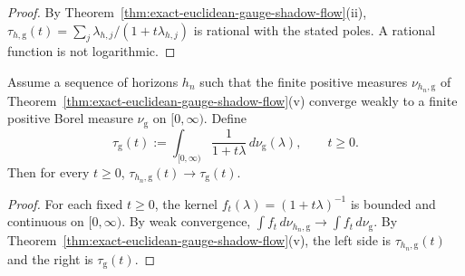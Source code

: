 \begin{proof}
By Theorem~\ref{thm:exact-euclidean-gauge-shadow-flow}(ii),
$\tau_{h,\mathrm g}(t)=\sum_j\lambda_{h,j}/(1+t\lambda_{h,j})$
is rational with the stated poles. A rational function is not logarithmic.
\end{proof}

\begin{theorem}
\label{thm:spectral-limit-gauge-shadow-flow}
Assume a sequence of horizons $h_n$ such that the finite positive measures
$\nu_{h_n,\mathrm g}$ of
Theorem~\ref{thm:exact-euclidean-gauge-shadow-flow}(v) converge weakly to
a finite positive Borel measure $\nu_{\mathrm g}$ on $[0,\infty)$.
Define
\[
\tau_{\mathrm g}(t)
:=
\int_{[0,\infty)}\frac{1}{1+t\lambda}\,d\nu_{\mathrm g}(\lambda),
\qquad t\ge 0.
\]
Then for every $t\ge 0$,
$\tau_{h_n,\mathrm g}(t)\to \tau_{\mathrm g}(t)$.
\end{theorem}

\begin{proof}
For each fixed $t\ge 0$, the kernel $f_t(\lambda)=(1+t\lambda)^{-1}$
is bounded and continuous on $[0,\infty)$. By weak convergence,
$\int f_t\,d\nu_{h_n,\mathrm g}\to\int f_t\,d\nu_{\mathrm g}$.
By Theorem~\ref{thm:exact-euclidean-gauge-shadow-flow}(v), the left side
is $\tau_{h_n,\mathrm g}(t)$ and the right is $\tau_{\mathrm g}(t)$.
\end{proof}
